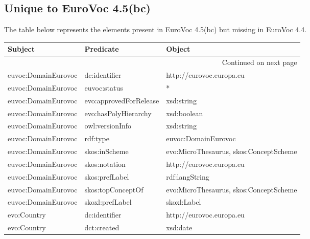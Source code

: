 \documentclass[10pt,a4paper,titlepage,final]{article}
\begin{document}
\subsection{Unique to EuroVoc 4.5(bc)}
The table below represents the elements present in EuroVoc 4.5(bc) but missing in EuroVoc 4.4.
\begin{tabularx}{\textwidth}{llX}
\toprule
                    Subject &               Predicate &                                             Object \\
\midrule
\endhead
\midrule
\multicolumn{3}{r}{{Continued on next page}} \\
\midrule
\endfoot

\bottomrule
\endlastfoot
        euvoc:DomainEurovoc &           dc:identifier &                           http://eurovoc.europa.eu \\
        euvoc:DomainEurovoc &            euvoc:status &                                                  * \\
        euvoc:DomainEurovoc &  evo:approvedForRelease &                                         xsd:string \\
        euvoc:DomainEurovoc &    evo:hasPolyHierarchy &                                        xsd:boolean \\
        euvoc:DomainEurovoc &         owl:versionInfo &                                         xsd:string \\
        euvoc:DomainEurovoc &                rdf:type &                                euvoc:DomainEurovoc \\
        euvoc:DomainEurovoc &           skos:inScheme &             evo:MicroThesaurus, skos:ConceptScheme \\
        euvoc:DomainEurovoc &           skos:notation &                           http://eurovoc.europa.eu \\
        euvoc:DomainEurovoc &          skos:prefLabel &                                     rdf:langString \\
        euvoc:DomainEurovoc &       skos:topConceptOf &             evo:MicroThesaurus, skos:ConceptScheme \\
        euvoc:DomainEurovoc &         skoxl:prefLabel &                                        skoxl:Label \\
                evo:Country &           dc:identifier &                           http://eurovoc.europa.eu \\
                evo:Country &             dct:created &                                           xsd:date \\

\end{tabularx}
\end{document}
